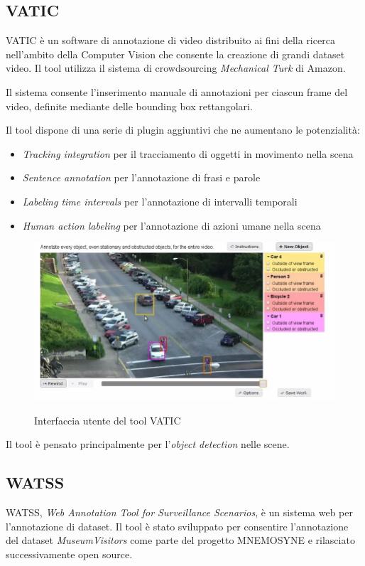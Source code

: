 \subsection{VATIC}

VATIC\cite{Vondrick:2013:ESU:2436010.2436013} è un software di annotazione di video distribuito ai fini della ricerca nell'ambito della Computer Vision che consente la creazione di grandi dataset video. Il tool utilizza il sistema di crowdsourcing \emph{Mechanical Turk} di Amazon.

Il sistema consente l'inserimento manuale di annotazioni per ciascun frame del video, definite mediante delle bounding box rettangolari. 

Il tool dispone di una serie di plugin aggiuntivi che ne aumentano le potenzialità:
\begin{itemize}
\item \emph{Tracking integration} per il tracciamento di oggetti in movimento nella scena
\item \emph{Sentence annotation} per l'annotazione di frasi e parole
\item \emph{Labeling time intervals} per l'annotazione di intervalli temporali
\item \emph{Human action labeling} per l'annotazione di azioni umane nella scena
\end{itemize}

\begin{figure}[h]
\centering
\includegraphics[width=0.6\linewidth]{images/vatic.jpg}
  \label{fig:vatic}
  \caption{Interfaccia utente del tool VATIC}
\end{figure}

Il tool è pensato principalmente per l'\emph{object detection} nelle scene.

\subsection{WATSS}

WATSS\cite{Bartoli:2015:WWA:2733373.2807411}, \emph{Web Annotation Tool for Surveillance Scenarios}, è un sistema web per l'annotazione di dataset. Il tool è stato sviluppato per consentire l'annotazione del dataset \emph{MuseumVisitors}\cite{bartoli2015museumvisitors} come parte del progetto MNEMOSYNE e rilasciato successivamente open source.

